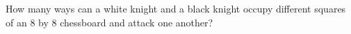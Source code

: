 How many ways can a white knight and a black knight occupy different squares of an $8$ by $8$ chessboard and attack one another?
